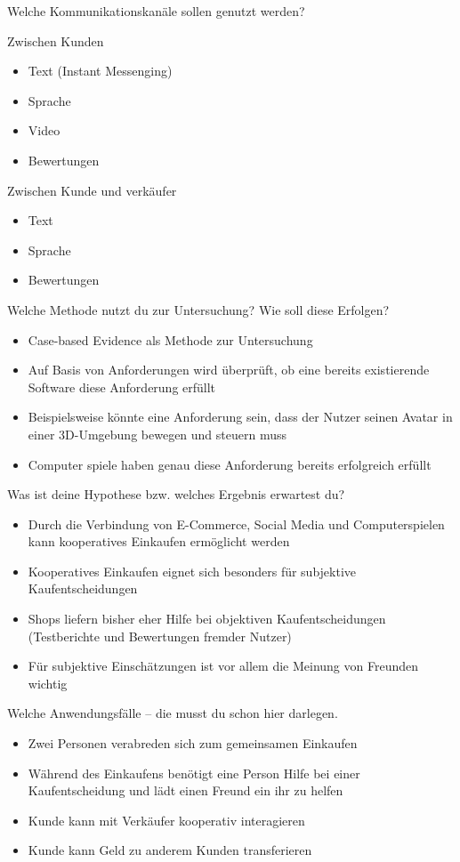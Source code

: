 Welche Kommunikationskanäle sollen genutzt werden? 

Zwischen Kunden

\begin{itemize}
\item Text (Instant Messenging) 
\item Sprache 
\item Video 
\item Bewertungen 
\end{itemize}

Zwischen Kunde und verkäufer 

\begin{itemize}
\item Text 
\item Sprache 
\item Bewertungen 
\end{itemize}

Welche Methode nutzt du zur Untersuchung? Wie soll diese Erfolgen?

\begin{itemize}
\item Case-based Evidence als Methode zur Untersuchung 
\item Auf Basis von Anforderungen wird überprüft, ob eine bereits existierende Software diese Anforderung erfüllt 
\item Beispielsweise könnte eine Anforderung sein, dass der Nutzer seinen Avatar in einer 3D-Umgebung bewegen und steuern muss 
\item Computer spiele haben genau diese Anforderung bereits erfolgreich erfüllt 
\end{itemize}

Was ist deine Hypothese bzw. welches Ergebnis erwartest du?

\begin{itemize}
\item Durch die Verbindung von E-Commerce, Social Media und Computerspielen kann kooperatives Einkaufen ermöglicht werden 
\item Kooperatives Einkaufen eignet sich besonders für subjektive Kaufentscheidungen 
\item Shops liefern bisher eher Hilfe bei objektiven Kaufentscheidungen (Testberichte und Bewertungen fremder Nutzer) 
\item Für subjektive Einschätzungen ist vor allem die Meinung von Freunden wichtig 
\end{itemize}

Welche Anwendungsfälle – die musst du schon hier darlegen.

\begin{itemize}
\item Zwei Personen verabreden sich zum gemeinsamen Einkaufen 
\item Während des Einkaufens benötigt eine Person Hilfe bei einer Kaufentscheidung und lädt einen Freund ein ihr zu helfen 
\item Kunde kann mit Verkäufer kooperativ interagieren 
\item Kunde kann Geld zu anderem Kunden transferieren
\end{itemize}
